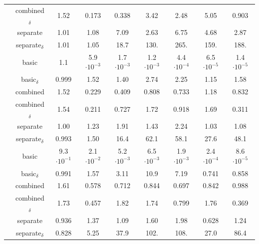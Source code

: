 \begin{table}[H]
\begin{tabular}{|c|c|ccccccc|}
        \cellcolor{white}
        & combined$_\delta$ & 1.52 & 0.173 & 0.338 & 3.42 & 2.48 & 5.05 & 0.903 \\
        \cellcolor{white}
        & separate & 1.01 & 1.08 & 7.09 & 2.63 & 6.75 & 4.68 & 2.87 \\
        \cellcolor{white}
        \multirow{-6}{*}{0.2\%}
        & separate$_\delta$ & 1.01 & 1.05 & 18.7 & 130. & 265. & 159. & 188. \\
        \hline
        \hline
        \rowcolor[gray]{.9}
        \cellcolor{white}
        & basic & 1.1 & 5.9$\cdot 10^{-3}$ & 1.7$\cdot 10^{-3}$ & 1.2$\cdot 10^{-3}$ & 4.4$\cdot 10^{-4}$ & 6.5$\cdot 10 ^{-5}$ & 1.4$\cdot 10^{-5 }$ \\
        \cline{2-9}
        \cellcolor{white}
        & basic$_\delta$ & 0.999 & 1.52 & 1.40 & 2.74 & 2.25 & 1.15 & 1.58 \\
        \cellcolor{white}
        & combined & 1.52 & 0.229 & 0.409 & 0.808 & 0.733 & 1.18 & 0.832 \\
        \cellcolor{white}
        & combined$_\delta$ & 1.54 & 0.211 & 0.727 & 1.72 & 0.918 & 1.69 & 0.311 \\
        \cellcolor{white}
        & separate & 1.00 & 1.23 & 1.91 & 1.43 & 2.24 & 1.03 & 1.08 \\
        \cellcolor{white}
        \multirow{-6}{*}{1\%}
        & separate$_\delta$ & 0.993 & 1.50 & 16.4 & 62.1 & 58.1 & 27.6 & 48.1 \\
        \hline
        \hline
        \rowcolor[gray]{.9}
        \cellcolor{white}
        & basic & 9.3$\cdot 10^{-1}$ & 2.1$\cdot 10^{-2}$ & 5.2$\cdot 10^{-3}$ & 6.5$\cdot 10^{-3}$ & 1.9$\cdot 10^{-3}$ & 2.4$\cdot 10^{-4}$ & 8.6$\cdot 10^{-5 }$ \\
        \cline{2-9}
        \cellcolor{white}
        & basic$_\delta$ & 0.991 & 1.57 & 3.11 & 10.9 & 7.19 & 0.741 & 0.858 \\
        \cellcolor{white}
        & combined & 1.61 & 0.578 & 0.712 & 0.844 & 0.697 & 0.842 & 0.988 \\
        \cellcolor{white}
        & combined$_\delta$ & 1.73 & 0.457 & 1.82 & 1.74 & 0.799 & 1.76 & 0.369 \\
        \cellcolor{white}
        & separate & 0.936 & 1.37 & 1.09 & 1.60 & 1.98 & 0.628 & 1.24 \\
        \cellcolor{white}
        \multirow{-6}{*}{5\%}
        & separate$_\delta$ & 0.828 & 5.25 & 37.9 & 102. & 108. & 27.0 & 86.4 \\
        \hline
        \hline

\end{tabular}
\end{table}
